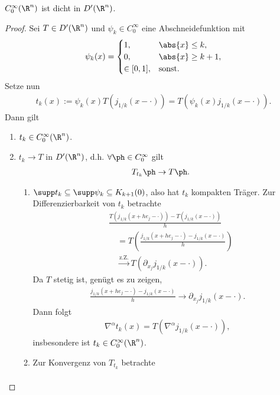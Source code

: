 \begin{prop}
\label{prop:3.10}
$C_0^\infty(\R^n)$ ist dicht in $D'(\R^n)$.\fishhere
\end{prop}
\begin{proof}
Sei $T\in D'(\R^n)$ und $\psi_k\in C_0^\infty$ eine Abschneidefunktion mit
\begin{align*}
\psi_k(x) =
\begin{cases}
1, & \abs{x}\le k,\\
0, & \abs{x}\ge k+1,\\
\in[0,1], &\text{sonst}.
\end{cases}
\end{align*}
Setze nun
\begin{align*}
t_k(x) := \psi_k(x) T\left(j_{1/k}(x-\cdot) \right) =
T\left(\psi_k(x)j_{1/k}(x-\cdot) \right).
\end{align*}
Dann gilt
\begin{enumerate}[label=\arabic{*}.)]
  \item $t_k\in C_0^\infty(\R^n)$.
  \item $t_k\to T$ in $D'(\R^n)$, d.h. $\forall\ph\in C_0^\infty$ gilt
\begin{align*}
T_{t_k}\ph \to T\ph.
\end{align*}
\begin{enumerate}[label=\alph{*})]
  \item $\supp t_k \subseteq \supp \psi_k \subseteq K_{k+1}(0)$, also hat $t_k$
  kompakten Träger. Zur Differenzierbarkeit von $t_k$ betrachte
  \begin{align*}
  &\frac{T\left(j_{1/k}(x + he_j-\cdot)
  \right)-T\left(j_{1/k}(x-\cdot) \right)}{h} \\ 
  &\quad = T\left(\frac{j_{1/k}(x +
  he_j-\cdot)-j_{1/k}(x-\cdot) }{h}\right)\\
  &\quad
  \overset{\text{z.Z.}}{\longrightarrow} T\left(\partial_{x_j}
  j_{1/k}(x-\cdot)\right).
  \end{align*} 
Da $T$ stetig ist, genügt es zu zeigen,
\begin{align*}
\frac{j_{1/k}(x + he_j-\cdot)-j_{1/k}(x-\cdot)
  }{h} \longrightarrow \partial_{x_j}
  j_{1/k}(x-\cdot). 
\end{align*}
Dann folgt
\begin{align*}
\nabla^\alpha t_k(x) = T\left(\nabla^\alpha j_{1/k}(x-\cdot) \right),
\end{align*}
insbesondere ist $t_k\in C_0^\infty(\R^n)$.
\item Zur Konvergenz von $T_{t_k}$ betrachte
\begin{align*}

\end{align*}
\end{enumerate}
\end{enumerate}
\end{proof}
